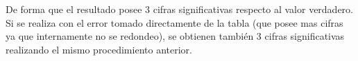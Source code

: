 \documentclass[12pt]{article}
\begin{document}
\begin{enumerate}[leftmargin=*,widest=9]
\begin{enumerate}[label=\alph*]
    De forma que el resultado posee 3 cifras significativas respecto al valor verdadero. Si se realiza con el error tomado directamente de la tabla (que posee mas cifras ya que internamente no se redondeo), se obtienen también 3 cifras significativas realizando el mismo procedimiento anterior.
    
    \end{enumerate}

    
  \end{enumerate}
  
\end{document}
